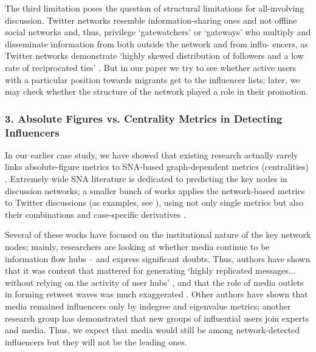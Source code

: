 The third limitation poses the question of structural limitations for all-involving discussion. Twitter networks resemble information-sharing ones and not offline social networks \cite[p.~264]{BastosRaimundoTravitzki} and, thus, privilege ‘gatewatchers’ \cite{Bruns} or ‘gateways’ \cite{BastosRaimundoTravitzki} who multiply and disseminate information from both outside the network and from influ- encers, as Twitter networks demonstrate ‘highly skewed distribution of followers and a low rate of reciprocated ties’ \cite[p.~263]{BastosRaimundoTravitzki}. But in our paper we try to see whether active users with a particular position towards migrants get to the influencer lists; later, we may check whether the structure of the network played a role in their promotion.

\subsubsection{3. Absolute Figures vs. Centrality Metrics in Detecting Influencers}

In our earlier case study, we have showed that existing research actually rarely links absolute-figure metrics to SNA-based graph-dependent metrics (centralities) \cite{BodrunovaBlekanovMaksimov}. Extremely wide SNA literature is dedicated to predicting the key nodes in discussion networks; a smaller bunch of works applies the network-based metrics to Twitter discussions (as examples, see \cite{DuboisGaffney,AlmindIngwersen}), using not only single metrics but also their combinations \cite{KwakLeePark,GonzalezBailonBorgeHolthoeferMoreno} and case-specific derivatives \cite{MairederWeeksDeZuniga}.

Several of these works have focused on the institutional nature of the key network nodes; mainly, researchers are looking at whether media continue to be information flow hubs -- and express significant doubts. Thus, authors \cite{BastosRaimundoTravitzki} have shown that it was content that mattered for generating ‘highly replicated messages... without relying on the activity of user hubs’ \cite[p.~260]{BastosRaimundoTravitzki}, and that the role of media outlets in forming retweet waves was much exaggerated \cite[p.~269]{AlmindIngwersen}. Other authors \cite{DuboisGaffney} have shown that media remained influencers only by indegree and eigenvalue metrics; another research group \cite{HilbertVasquezHalpern} has demonstrated that new groups of influential users join experts and media. Thus, we expect that media would still be among network-detected influencers but they will not be the leading ones.

